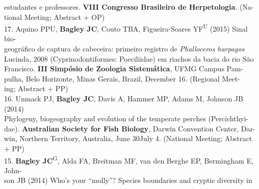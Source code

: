 \documentclass[margin,line]{res}
\begin{document}
\begin{resume}
\hspace*{8mm} estudantes e professores. \textbf{VIII Congresso Brasileiro de Herpetologia}. (Na-\\ \vspace{2mm}
\hspace*{8mm}tional Meeting; Abstract + OP) \\
17. Aquino PPU, \textbf{Bagley JC}, Couto TBA, Figueira-Soares YF\textsuperscript{U} (2015) Sinal bio-\\
\hspace*{8mm} geogr\'{a}fico de captura de cabeceira: primeiro registro de \emph{Phalloceros harpagos}\\
\hspace*{8mm} Lucinda, 2008 (Cyprinodontiformes: Poeciliidae) em riachos da bacia do rio S\~{a}o\\
\hspace*{8mm} Francisco. \textbf{III Simp\'{o}sio de Zoologia Sistem\'{a}tica}, UFMG Campus Pam-\\
\hspace*{8mm}pulha, Belo Horizonte, Minas Gerais, Brazil, December 16. (Regional Meet-\\ \vspace{2mm}
\hspace*{8mm}ing; Abstract + PP) \\
16. Unmack PJ, \textbf{Bagley JC}, Davis A, Hammer MP, Adams M, Johnson JB (2014)\\
\hspace*{8mm} Phylogeny, biogeography and evolution of the temperate perches (Percichthyi-\\
\hspace*{8mm} dae). \textbf{Australian Society for Fish Biology}, Darwin Convention Center, Dar-\\
\hspace*{8mm} win, Northern Territory, Australia, June 30\textendash July 4. (National Meeting; Abstract \\ \vspace{2mm}
\hspace*{8mm}+ PP) \\
15. \textbf{Bagley JC}\textsuperscript{G}, Alda FA, Breitman MF, van den Berghe EP, Bermingham E, John-\\
\hspace*{8mm} son JB (2014) Who's your ``molly''?  Species boundaries and cryptic diversity in\\

\end{resume}
\end{document}
